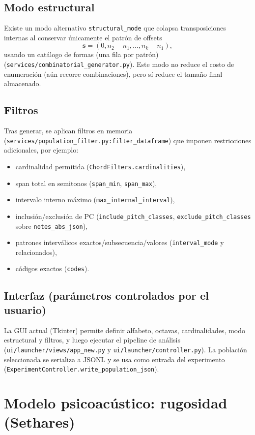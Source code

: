 \subsection{Modo estructural}
Existe un modo alternativo \texttt{structural\_mode} que colapsa transposiciones internas al conservar únicamente el patrón de offsets
\[
\mathbf{s}=(0, n_2-n_1,\dots,n_k-n_1),
\]
usando un catálogo de formas (una fila por patrón) (\texttt{services/combinatorial\_generator.py}).
Este modo no reduce el costo de enumeración (aún recorre combinaciones), pero sí reduce el tamaño final almacenado.

\subsection{Filtros}
Tras generar, se aplican filtros en memoria (\texttt{services/population\_filter.py:filter\_dataframe}) que imponen restricciones adicionales, por ejemplo:
\begin{itemize}
  \item cardinalidad permitida (\texttt{ChordFilters.cardinalities}),
  \item span total en semitonos (\texttt{span\_min}, \texttt{span\_max}),
  \item intervalo interno máximo (\texttt{max\_internal\_interval}),
  \item inclusión/exclusión de PC (\texttt{include\_pitch\_classes}, \texttt{exclude\_pitch\_classes} sobre \texttt{notes\_abs\_json}),
  \item patrones interválicos exactos/subsecuencia/valores (\texttt{interval\_mode} y relacionados),
  \item códigos exactos (\texttt{codes}).
\end{itemize}

\subsection{Interfaz (parámetros controlados por el usuario)}
La GUI actual (Tkinter) permite definir alfabeto, octavas, cardinalidades, modo estructural y filtros, y luego ejecutar el pipeline de análisis (\texttt{ui/launcher/views/app\_new.py} y \texttt{ui/launcher/controller.py}). La población seleccionada se serializa a JSONL y se usa como entrada del experimento (\texttt{ExperimentController.write\_population\_json}).

\section{Modelo psicoacústico: rugosidad (Sethares)}
\label{sec:rugosidad}

